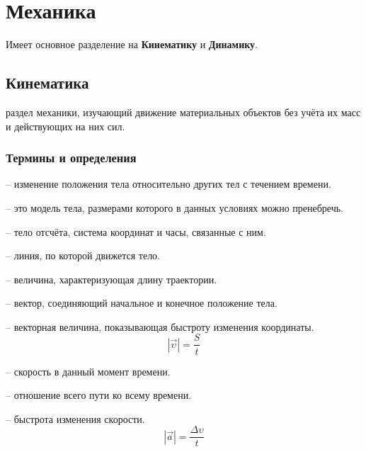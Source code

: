 \section{Механика}
Имеет основное разделение на \textbf{Кинематику} и \textbf{Динамику}.

\subsection{Кинематика}
раздел механики, изучающий движение материальных объектов без учёта их масс и действующих на них сил.
\par\medskip

\subsubsection{Термины и определения}

 -- изменение положения тела относительно других тел с течением времени.
\par\medskip

 -- это модель тела, размерами которого в данных условиях можно пренебречь.
\par\medskip

 -- тело отсчёта, система координат и часы, связанные с ним.
\par\medskip

 -- линия, по которой движется тело.
\par\medskip

 -- величина, характеризующая длину траектории.
\par\medskip

 -- вектор, соединяющий начальное и конечное положение тела.
\par\medskip

 -- векторная величина, показывающая быстроту изменения координаты.
$$|\vec{\upsilon}| = \frac{S}{t}$$

 -- скорость в данный момент времени.
\par\medskip

 -- отношение всего пути ко всему времени.
\par\medskip

 -- быстрота изменения скорости.
$$|\vec{a}| = \frac{\Delta\upsilon}{t}$$

